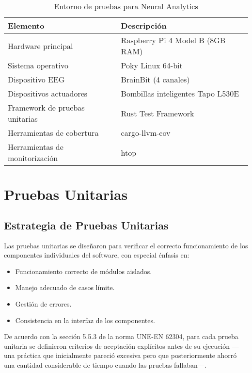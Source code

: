 \begin{table}[ht]
    \centering
    \small
    \begin{tabular}{|p{4cm}|p{8cm}|}
        \hline
        \textbf{Elemento} & \textbf{Descripción} \\
        \hline
        Hardware principal & Raspberry Pi 4 Model B (8GB RAM) \\
        \hline
        Sistema operativo & Poky Linux 64-bit \\
        \hline
        Dispositivo EEG & BrainBit (4 canales) \\
        \hline
        Dispositivos actuadores & Bombillas inteligentes Tapo L530E \\
        \hline
        Framework de pruebas unitarias & Rust Test Framework \\
        \hline
        Herramientas de cobertura & cargo-llvm-cov \\
        \hline
        Herramientas de monitorización & htop \\
        \hline
    \end{tabular}
    \caption{Entorno de pruebas para Neural Analytics}
    \label{tab:test_environment}
\end{table}

\section{Pruebas Unitarias}

\subsection{Estrategia de Pruebas Unitarias}

Las pruebas unitarias se diseñaron para verificar el correcto funcionamiento de los componentes individuales del software, con especial énfasis en:

\begin{itemize}
    \item Funcionamiento correcto de módulos aislados.
    \item Manejo adecuado de casos límite.
    \item Gestión de errores.
    \item Consistencia en la interfaz de los componentes.
\end{itemize}

De acuerdo con la sección 5.5.3 de la norma UNE-EN 62304, para cada prueba unitaria se definieron criterios de aceptación explícitos antes de su ejecución —una práctica que inicialmente pareció excesiva pero que posteriormente ahorró una cantidad considerable de tiempo cuando las pruebas fallaban—.

